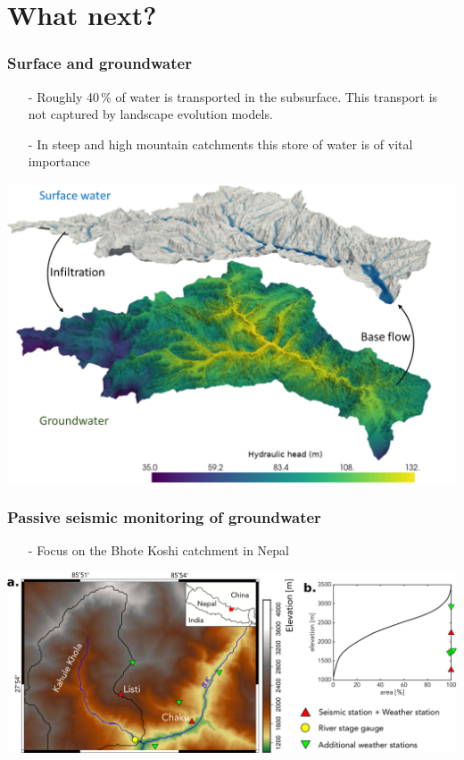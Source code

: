 \documentclass[aspectratio=169]{beamer}
\begin{document}
\section{What next?}

\begin{frame}
    \frametitle{What next: Groundwater}
    \texttt{[image: ./figures/\{groundwater.svg]}.png}
\end{frame}

\begin{frame}
    \frametitle{Surface and groundwater}
    \begin{itemize}
        \item[-]{Roughly 40\,\% of water is transported in the subsurface. This transport is not captured by landscape evolution models.}
        \item[-]{In steep and high mountain catchments this store of water is of vital importance}
    \end{itemize}
    \centering
    \includegraphics[width=0.6\paperwidth]{./pictures/graphic1.png}
\end{frame}

\begin{frame}
    \frametitle{Passive seismic monitoring of groundwater}
    \begin{itemize}
        \item[-]{Focus on the Bhote Koshi catchment in Nepal}
    \end{itemize}
    \centering
    \includegraphics[height=0.6\paperheight]{./figures/illien-figure.png}
\end{frame}
\end{document}
